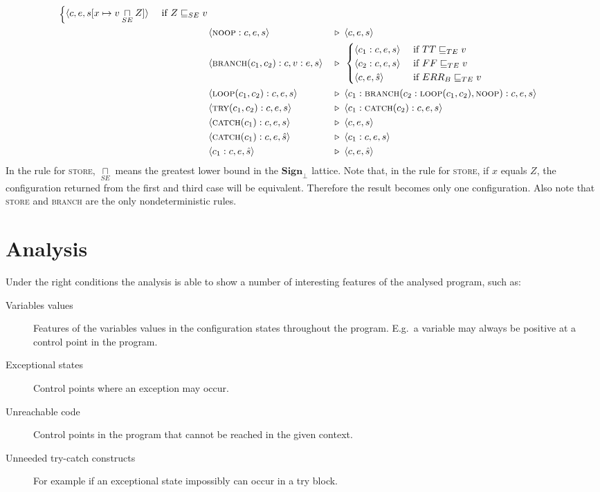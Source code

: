 \documentclass[11pt,oneside,a4paper]{article}
\newcommand{\AMIns}[1]{\textsc{#1}}
\newcommand{\AMConf}[3]{\langle #1, #2, #3 \rangle}
\newcommand{\AMArrow}{\: &\triangleright&\:\;}
\newcommand{\sign}{\textbf{Sign}_{\bot}}
\begin{document}
\begin{align*}
\begin{cases}
    \AMConf{c}{e}{s[x \mapsto v \underset{SE}{\sqcap} Z]} & 
    \text{ if } Z \sqsubseteq_{SE} v \\
 \end{cases}& \\
&\AMConf{\AMIns{noop}:c}{e}{s} \AMArrow 
 \AMConf{c}{e}{s} \\
&\AMConf{\AMIns{branch}(c_1,c_2):c}{v:e}{s} \AMArrow
 \begin{cases}
    \AMConf{c_1:c}{e}{s} & \text{ if } TT \sqsubseteq_{TE} v \\
    \AMConf{c_2:c}{e}{s} & \text{ if } FF \sqsubseteq_{TE} v \\
    \AMConf{c}{e}{\hat{s}} & \text{ if } ERR_B \sqsubseteq_{TE} v \\
 \end{cases}& \\
&\AMConf{\AMIns{loop}(c_1,c_2):c}{e}{s} \AMArrow 
 \AMConf{c_1:\AMIns{branch}(c_2:\AMIns{loop}(c_1, c_2), \AMIns{noop}):c}{e}{s}\\
&\AMConf{\AMIns{try}(c_1, c_2):c}{e}{s} \AMArrow
 \AMConf{c_1:\AMIns{catch}(c_2):c}{e}{s}& \\
&\AMConf{\AMIns{catch}(c_1):c}{e}{s} \AMArrow
 \AMConf{c}{e}{s}& \\
&\AMConf{\AMIns{catch}(c_1):c}{e}{\hat{s}} \AMArrow
 \AMConf{c_1:c}{e}{s}& \\
&\AMConf{c_1:c}{e}{\hat{s}} \AMArrow \AMConf{c}{e}{\hat{s}}
\end{align*}
In the rule for \textsc{store}, \(\underset{SE}{\sqcap}\) means the greatest 
lower bound in the \(\sign\) lattice.
Note that, in the rule for \textsc{store}, if \(x\) equals \(Z\), the 
configuration returned from the first and third case will be equivalent.
Therefore the result becomes only one configuration. Also note that
\textsc{store} and \textsc{branch} are the only nondeterministic rules.

\section*{Analysis}
  Under the right conditions the analysis is able to show a number of
  interesting features of the analysed program, such as:

  \begin{description}
    \item[Variables values] Features of the variables values in the
      configuration states throughout the program. E.g.\ a variable may always
      be positive at a control point in the program.
    \item[Exceptional states] Control points where an exception may occur.
    \item[Unreachable code] Control points in the program that cannot be
      reached in the given context.
    \item[Unneeded try-catch constructs] For example if an exceptional state
      impossibly can occur in a try block.
  \end{description}
\end{document}
